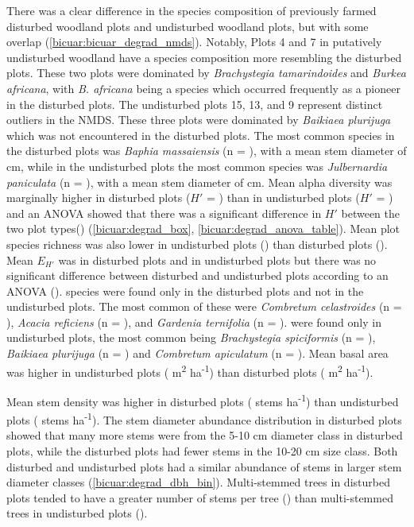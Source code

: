 \begin{refsection}
There was a clear difference in the species composition of previously farmed disturbed woodland plots and undisturbed woodland plots, but with some overlap (\autoref{bicuar:bicuar_degrad_nmds}). Notably, Plots 4 and 7 in putatively undisturbed woodland have a species composition more resembling the disturbed plots. These two plots were dominated by \textit{Brachystegia tamarindoides} and \textit{Burkea africana}, with \textit{B. africana} being a species which occurred frequently as a pioneer in the disturbed plots. The undisturbed plots 15, 13, and 9 represent distinct outliers in the NMDS. These three plots were dominated by \textit{Baikiaea plurijuga} which was not encountered in the disturbed plots. The most common species in the disturbed plots was \textit{Baphia massaiensis} (n = \nbmdegrad{}), with a mean stem diameter of \bmdbhdegrad{} cm, while in the undisturbed plots the most common species was \textit{Julbernardia paniculata} (n = \njpdegrad{}), with a mean stem diameter of \jpdbhbicuar{} cm. Mean alpha diversity was marginally higher in disturbed plots ($H'$ = \degradshannon{}) than in undisturbed plots ($H'$ = \bicuarsubshannon{}) and an ANOVA showed that there was a significant difference in $H'$ between the two plot types(\lmshannondegrad{}) (\autoref{bicuar:degrad_box}, \autoref{bicuar:degrad_anova_table}). Mean plot species richness was also lower in undisturbed plots (\bicuarsubrich{}) than disturbed plots (\degradrich{}). Mean $E_{H'}$ was \degradequit{} in disturbed plots and \bicuarsubequit{} in undisturbed plots but there was no significant difference between disturbed and undisturbed plots according to an ANOVA (\lmequitdegrad{}). \ndegradonlyspecies{} species were found only in the disturbed plots and not in the undisturbed plots. The most common of these were \textit{Combretum celastroides} (n = \nccdegrad{}), \textit{Acacia reficiens} (n = \nvrdegrad{}), and \textit{Gardenia ternifolia} (n = \ngtdegrad{}). \nbigonlyspecies{} were found only in undisturbed plots, the most common being \textit{Brachystegia spiciformis} (n = \nbsbig{}), \textit{Baikiaea plurijuga} (n = \nbpbig{}) and \textit{Combretum apiculatum} (n = \ncabig{}). Mean basal area was higher in undisturbed plots (\bicuarsubba{} m\textsuperscript{2} ha\textsuperscript{-1}) than disturbed plots (\degradba{} m\textsuperscript{2} ha\textsuperscript{-1}). 

Mean stem density was higher in disturbed plots (\stemdensdegrad{} stems ha\textsuperscript{-1}) than undisturbed plots (\stemdensbicuar{} stems ha\textsuperscript{-1}). The stem diameter abundance distribution in disturbed plots showed that many more stems were from the 5-10 cm diameter class in disturbed plots, while the disturbed plots had fewer stems in the 10-20 cm size class. Both disturbed and undisturbed plots had a similar abundance of stems in larger stem diameter classes (\autoref{bicuar:degrad_dbh_bin}). Multi-stemmed trees in disturbed plots tended to have a greater number of stems per tree (\multistemdegrad{}) than multi-stemmed trees in undisturbed plots (\multistembicuar{}).


\end{refsection}
